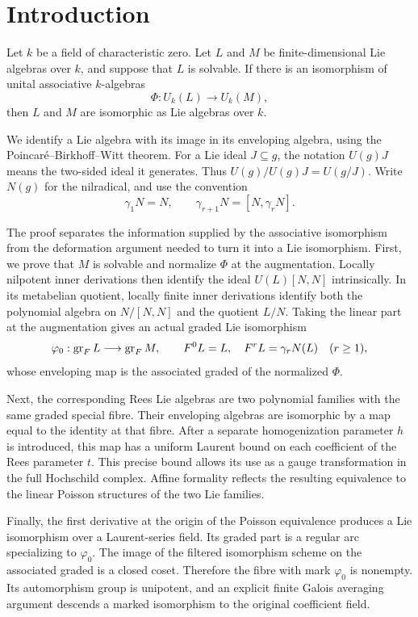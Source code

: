 \section{Introduction}\label{sec:overview}

\begin{theorem}\label{thm:main}
Let $k$ be a field of characteristic zero. Let $L$ and
$M$ be finite-dimensional Lie algebras over $k$, and suppose that
$L$ is solvable. If there is an isomorphism of unital associative
$k$-algebras
\[
 \Phi:U_k(L)\longrightarrow U_k(M),
\]
then $L$ and $M$ are isomorphic as Lie algebras over $k$.
\end{theorem}

We identify a Lie algebra with its image in its enveloping algebra, using the
Poincar\'e--Birkhoff--Witt theorem. For a Lie ideal $J\subseteq g$,
the notation $U(g)J$ means the two-sided ideal it generates. Thus
$U(g)/U(g)J=U(g/J)$. Write $N(g)$
for the nilradical, and use the convention
\[
 \gamma_1N=N,\qquad \gamma_{r+1}N=[N,\gamma_rN].
\]

The proof separates the information supplied by the associative isomorphism
from the deformation argument needed to turn it into a Lie isomorphism.
First, we prove that $M$ is solvable and normalize $\Phi$ at the
augmentation. Locally nilpotent inner derivations then identify the ideal
$U(L)[N,N]$ intrinsically. In its metabelian quotient, locally
finite inner derivations identify both the polynomial algebra on
$N/[N,N]$ and the quotient $L/N$. Taking the linear part at the
augmentation gives an actual graded Lie isomorphism
\[
 \varphi_0:\operatorname{gr}_FL\longrightarrow\operatorname{gr}_FM,
 \qquad F^0L=L,\quad
 F^rL=\gamma_rN(L)\quad(r\geq1),
\]
whose enveloping map is the associated graded of the normalized $\Phi$.

Next, the corresponding Rees Lie algebras are two polynomial families with
the same graded special fibre. Their enveloping algebras are isomorphic by
a map equal to the identity at that fibre. After a separate homogenization
parameter $h$ is introduced, this map has a uniform Laurent bound on
each coefficient of the Rees parameter $t$. This precise bound allows its
use as a gauge transformation in the full Hochschild complex. Affine
formality reflects the resulting equivalence to the linear Poisson
structures of the two Lie families.

Finally, the first derivative at the origin of the Poisson equivalence
produces a Lie isomorphism over a Laurent-series field. Its graded part is
a regular arc specializing to $\varphi_0$. The image of the filtered
isomorphism scheme on the associated graded is a closed coset. Therefore
the fibre with mark $\varphi_0$ is nonempty. Its automorphism group is
unipotent, and an explicit finite Galois averaging argument descends a
marked isomorphism to the original coefficient field.

